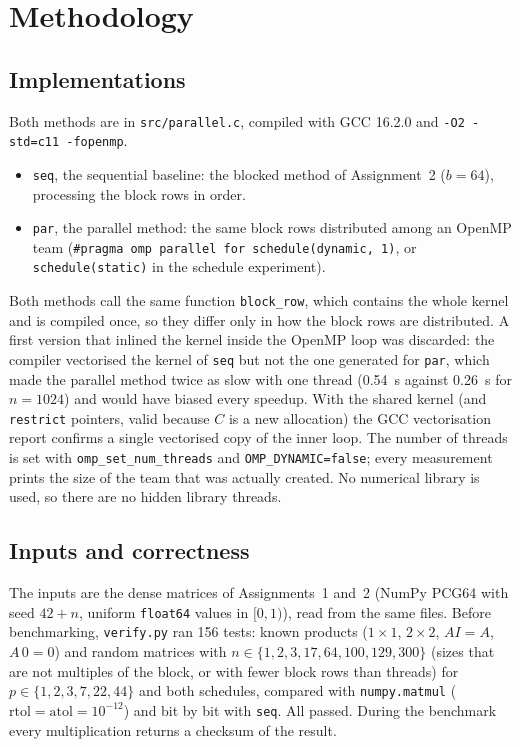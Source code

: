 \documentclass[12pt,a4paper]{report}
\begin{document}
\chapter{Methodology}
\label{chap:method}

\section{Implementations}

Both methods are in \texttt{src/parallel.c}, compiled with GCC 16.2.0 and \texttt{-O2 -std=c11 -fopenmp}.
\begin{itemize}
  \item \texttt{seq}, the sequential baseline: the blocked method of Assignment~2 ($b = 64$), processing the block
  rows in order.
  \item \texttt{par}, the parallel method: the same block rows distributed among an OpenMP team
  (\texttt{\#pragma omp parallel for schedule(dynamic, 1)}, or \texttt{schedule(static)} in the schedule
  experiment).
\end{itemize}
Both methods call the same function \texttt{block\_row}, which contains the whole kernel and is compiled once, so they
differ only in how the block rows are distributed. A first version that inlined the kernel inside the OpenMP loop was
discarded: the compiler vectorised the kernel of \texttt{seq} but not the one generated for \texttt{par}, which made
the parallel method twice as slow with one thread (0.54~s against 0.26~s for $n = 1024$) and would have biased every
speedup. With the shared kernel (and \texttt{restrict} pointers, valid because $C$ is a new allocation) the GCC
vectorisation report confirms a single vectorised copy of the inner loop. The number of threads is set with
\texttt{omp\_set\_num\_threads} and \texttt{OMP\_DYNAMIC=false}; every measurement prints the size of the team that
was actually created. No numerical library is used, so there are no hidden library threads.

\section{Inputs and correctness}

The inputs are the dense matrices of Assignments~1 and~2 (NumPy PCG64 with seed $42+n$, uniform \texttt{float64}
values in $[0,1)$), read from the same files. Before benchmarking, \texttt{verify.py} ran 156 tests: known products
($1\times1$, $2\times2$, $AI = A$, $A\,0 = 0$) and random matrices with
$n \in \{1, 2, 3, 17, 64, 100, 129, 300\}$ (sizes that are not multiples of the block, or with fewer block rows than
threads) for $p \in \{1, 2, 3, 7, 22, 44\}$ and both schedules, compared with \texttt{numpy.matmul}
($\mathrm{rtol} = \mathrm{atol} = 10^{-12}$) and bit by bit with \texttt{seq}. All passed. During the benchmark every
multiplication returns a checksum of the result.
\end{document}
